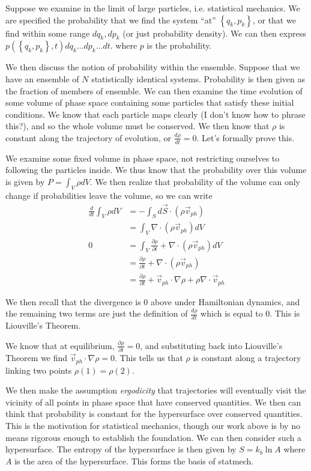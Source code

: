 \documentclass[10pt]{report}
\newcommand{\rd}[2]{\frac{d#1}{d#2}}
\newcommand{\pd}[2]{\frac{\partial #1}{\partial#2}}
\begin{document}
Suppose we examine in the limit of large particles, i.e. statistical mechanics. We are specified the probability that we find the system ``at'' $\left\{ q_k, p_k \right\}$, or that we find within some range $dq_k, dp_k$ (or just probability density). We can then express $p(\left\{ q_k, p_k \right\},t) dq_k\dots dp_k\dots dt$. where $p$ is the probability.

We then discuss the notion of probability within the ensemble. Suppose that we have an ensemble of $N$ statistically identical systems. Probability is then given as the fraction of members of ensemble. We can then examine the time evolution of some volume of phase space containing some particles that satisfy these initial conditions. We know that each particle maps clearly (I don't know how to phrase this?), and so the whole volume must be conserved. We then know that $\rho$ is constant along the trajectory of evolution, or $\rd{\rho}{t} = 0$. Let's formally prove this.

We examine some fixed volume in phase space, not restricting ourselves to following the particles inside. We thus know that the probability over this volume is given by $P = \int_V \rho dV$. We then realize that probability of the volume can only change if probabilities leave the volume, so we can write 
\begin{align*}
    \rd{}{t}\int_V \rho dV &= -\int_S d\vec{S} \cdot (\rho \vec{v}_{ph}) \\
    &= \int_V \nabla \cdot (\rho \vec{v}_{ph}) dV\\
    0 &= \int_V \pd{\rho}{t}+ \nabla \cdot (\rho \vec{v}_{ph}) dV\\
    &= \pd{\rho}{t} + \nabla\cdot (\rho \vec{v}_{ph})\\
    &= \pd{\rho}{t} + \vec{v}_{ph}\cdot \nabla \rho + \rho \nabla \cdot \vec{v}_{ph}
\end{align*}

We then recall that the divergence is $0$ above under Hamiltonian dynamics, and the remaining two terms are just the definition of $\rd{\rho}{t}$ which is equal to $0$. This is Liouville's Theorem.

We know that at equilibrium, $\pd{\rho}{t} = 0$, and substituting back into Liouville's Theorem we find $\vec{v}_{ph} \cdot \nabla \rho = 0$. This tells us that $\rho$ is constant along a trajectory linking two points $\rho(1) = \rho(2)$.

We then make the assumption \emph{ergodicity} that trajectories will eventually visit the vicinity of all points in phase space that have conserved quantities. We then can think that probability is constant for the hypersurface over conserved quantities. This is the motivation for statistical mechanics, though our work above is by no means rigorous enough to establish the foundation. We can then consider such a hypersurface. The entropy of the hypersurface is then given by $S = k_b \ln A$ where $A$ is the area of the hypersurface. This forms the basis of statmech. 
\end{document}
